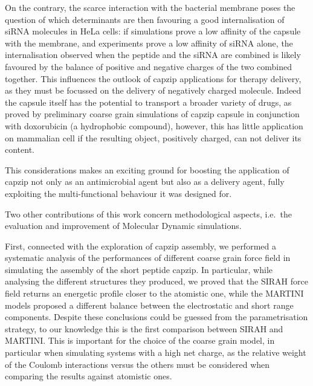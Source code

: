 On the contrary, the scarce interaction with the bacterial membrane poses the question of which determinants are then favouring a good internalisation of siRNA molecules in HeLa cells: if simulations prove a low affinity of the capsule with the membrane, and experiments prove a low affinity of siRNA alone, the internalisation observed when the peptide and the siRNA are combined is likely favoured by the balance of positive and negative charges of the two combined together. This influences the outlook of capzip applications for therapy delivery, as they must be focussed on the delivery of negatively charged molecule.
%
Indeed the capsule itself has the potential to transport a broader variety of drugs, as proved by preliminary coarse grain simulations of capzip capsule in conjunction with doxorubicin (a hydrophobic compound), however, this has little application on mammalian cell if the resulting object, positively charged, can not deliver its content.

This considerations makes an exciting ground for boosting the application of capzip not only as an antimicrobial agent but also as a delivery agent, fully exploiting the multi-functional behaviour it was designed for.


Two other contributions of this work concern methodological aspects, i.e.\ the evaluation and improvement of Molecular Dynamic simulations.

First, connected with the exploration of capzip assembly, we performed a systematic analysis of the performances of different coarse grain force field in simulating the assembly of the short peptide capzip. In particular, while analysing the different structures they produced, we proved that the SIRAH force field returns an energetic profile closer to the atomistic one, while the MARTINI models proposed a different balance between the electrostatic and short range components. Despite these conclusions could be guessed from the parametrisation strategy, to our knowledge this is the first comparison between SIRAH and MARTINI.
This is important for the choice of the coarse grain model, in particular when simulating systems with a high net charge, as the relative weight of the Coulomb interactions versus the others must be considered when comparing the results against atomistic ones.

